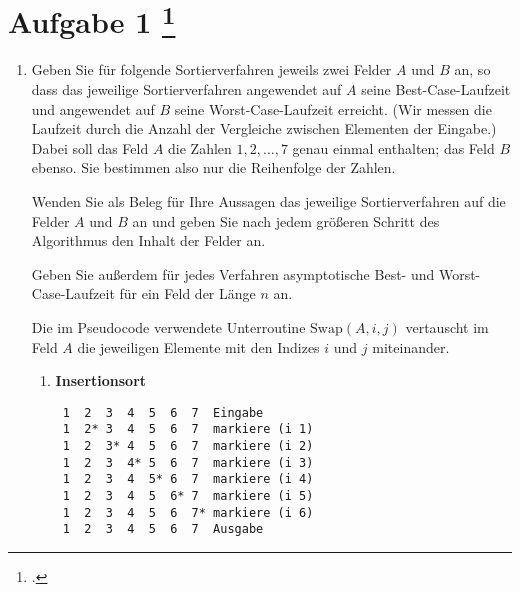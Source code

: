 \documentclass{lehramt-informatik-aufgabe}
\begin{document}
\section{Aufgabe 1
\footcite{66115:2021:03}}

\begin{enumerate}


\item Geben Sie für folgende Sortierverfahren jeweils zwei Felder $A$
und $B$ an, so dass das jeweilige Sortierverfahren angewendet auf $A$
seine Best-Case-Laufzeit und angewendet auf $B$ seine
Worst-Case-Laufzeit erreicht. (Wir messen die Laufzeit durch die Anzahl
der Vergleiche zwischen Elementen der Eingabe.) Dabei soll das Feld $A$
die Zahlen $1,2,\dots,7$ genau einmal enthalten; das Feld $B$ ebenso.
Sie bestimmen also nur die Reihenfolge der Zahlen.

Wenden Sie als Beleg für Ihre Aussagen das jeweilige Sortierverfahren
auf die Felder $A$ und $B$ an und geben Sie nach jedem größeren Schritt
des Algorithmus den Inhalt der Felder an.

Geben Sie außerdem für jedes Verfahren asymptotische Best- und
Worst-Case-Laufzeit für ein Feld der Länge $n$ an.

Die im Pseudocode verwendete Unterroutine $\text{Swap} (A,i,j)$
vertauscht im Feld $A$ die jeweiligen Elemente mit den Indizes $i$ und
$j$ miteinander.
\begin{enumerate}


\item \textbf{Insertionsort}

\begin{liAntwort}


\begin{verbatim}
 1  2  3  4  5  6  7  Eingabe
 1  2* 3  4  5  6  7  markiere (i 1)
 1  2  3* 4  5  6  7  markiere (i 2)
 1  2  3  4* 5  6  7  markiere (i 3)
 1  2  3  4  5* 6  7  markiere (i 4)
 1  2  3  4  5  6* 7  markiere (i 5)
 1  2  3  4  5  6  7* markiere (i 6)
 1  2  3  4  5  6  7  Ausgabe
\end{verbatim}




\end{liAntwort}
\end{enumerate}
\end{enumerate}
\end{document}
